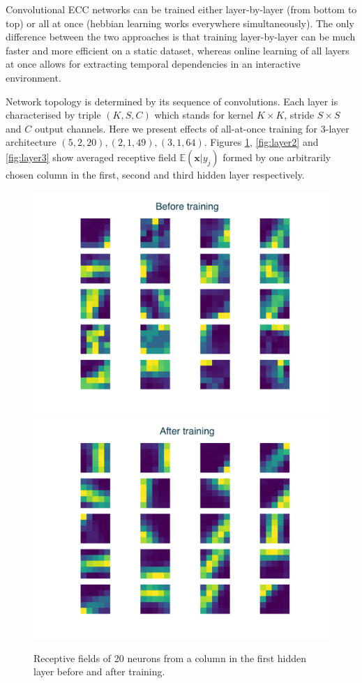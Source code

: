 \documentclass[12pt]{article}
\begin{document}
Convolutional ECC networks can be trained either layer-by-layer (from bottom to top) or all at once (hebbian learning works everywhere simultaneously). The only difference between the two approaches is that training layer-by-layer can be much faster and more efficient on a static dataset, whereas online learning of all layers at once allows for extracting temporal dependencies in an interactive environment. 

Network topology is determined by its sequence of convolutions. Each layer is characterised by triple $(K, S, C)$ which stands for kernel $K \times K$, stride $S \times S$ and $C$ output channels. Here we present effects of all-at-once training for 3-layer architecture $(5,2,20) ,(2,1,49),  (3,1 ,64)$. Figures  \ref{fig:layer1},  \ref{fig:layer2} and  \ref{fig:layer3} show averaged receptive field $\mathbb{E}(\boldsymbol{x}|y_j)$ formed by one arbitrarily chosen column in the first, second and third hidden layer respectively.


\begin{figure}[!htbp]
	\centering
	\includegraphics[width=12cm]{k5s2c1d1_c20 machine before}
	\includegraphics[width=12cm]{k5s2c1d1_c20 machine after}
	\caption{Receptive fields of 20 neurons from a column in the first hidden layer before and after training.}
	\label{fig:layer1}
\end{figure} 
\end{document}

